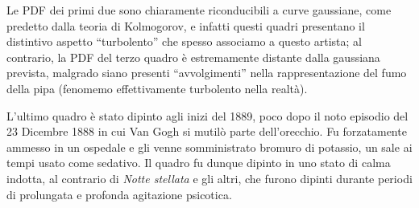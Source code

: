 \documentclass[12pt,a4paper]{article}
\numberwithin{equation}{section}
\begin{document}
Le PDF dei primi due sono chiaramente riconducibili a curve gaussiane, come predetto dalla teoria di Kolmogorov, e infatti questi quadri presentano il distintivo aspetto ``turbolento'' che spesso associamo a questo artista; al contrario, la PDF del terzo quadro è estremamente distante dalla gaussiana prevista, malgrado siano presenti ``avvolgimenti'' nella rappresentazione del fumo della pipa (fenomemo effettivamente turbolento nella realtà).

L'ultimo quadro è stato dipinto agli inizi del 1889, poco dopo il noto episodio del 23 Dicembre 1888 in cui Van Gogh si mutilò parte dell'orecchio. Fu forzatamente ammesso in un ospedale e gli venne somministrato bromuro di potassio, un sale ai tempi usato come sedativo. Il quadro fu dunque dipinto in uno stato di calma indotta, al contrario di \emph{Notte stellata} e gli altri, che furono dipinti durante periodi di prolungata e profonda agitazione psicotica.

\tableofcontents
\end{document}
